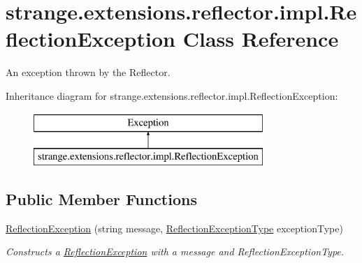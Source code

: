 \hypertarget{classstrange_1_1extensions_1_1reflector_1_1impl_1_1_reflection_exception}{\section{strange.\-extensions.\-reflector.\-impl.\-Reflection\-Exception Class Reference}
\label{classstrange_1_1extensions_1_1reflector_1_1impl_1_1_reflection_exception}
}


An exception thrown by the Reflector.  


Inheritance diagram for strange.\-extensions.\-reflector.\-impl.\-Reflection\-Exception\-:\begin{figure}[H]
\begin{center}
\leavevmode
\includegraphics[height=2.000000cm]{classstrange_1_1extensions_1_1reflector_1_1impl_1_1_reflection_exception}
\end{center}
\end{figure}
\subsection*{Public Member Functions}
\begin{DoxyCompactItemize}
\item 
\hypertarget{classstrange_1_1extensions_1_1reflector_1_1impl_1_1_reflection_exception_a9175ff4dec7b3044665a213353072198}{\hyperlink{classstrange_1_1extensions_1_1reflector_1_1impl_1_1_reflection_exception_a9175ff4dec7b3044665a213353072198}{Reflection\-Exception} (string message, \hyperlink{namespacestrange_1_1extensions_1_1reflector_1_1api_a4470d7d3edf61dfa229aec6e9a914159}{Reflection\-Exception\-Type} exception\-Type)}\label{classstrange_1_1extensions_1_1reflector_1_1impl_1_1_reflection_exception_a9175ff4dec7b3044665a213353072198}

\begin{DoxyCompactList}\small\item\em Constructs a \hyperlink{classstrange_1_1extensions_1_1reflector_1_1impl_1_1_reflection_exception}{Reflection\-Exception} with a message and Reflection\-Exception\-Type. \end{DoxyCompactList}\end{DoxyCompactItemize}

